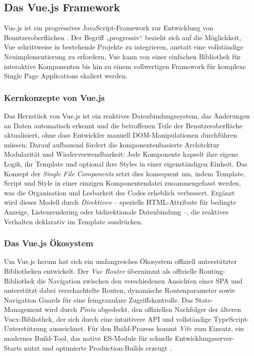 \subsection{Das Vue.js Framework}
\label{subsec:vuejs}

Vue.js ist ein progressives JavaScript-Framework zur Entwicklung von Benutzeroberflächen \cite{vuejs2025, ribeiro2020}. Der Begriff „progressiv“ bezieht sich auf die Möglichkeit, Vue schrittweise in bestehende Projekte zu integrieren, anstatt eine vollständige Neuimplementierung zu erfordern. Vue kann von einer einfachen Bibliothek für interaktive Komponenten bis hin zu einem vollwertigen Framework für komplexe Single Page Applications skaliert werden.

\subsubsection{Kernkonzepte von Vue.js}

Das Herzstück von Vue.js ist ein reaktives Datenbindungssystem, das Änderungen an Daten automatisch erkennt und die betroffenen Teile der Benutzeroberfläche aktualisiert, ohne dass Entwickler manuell DOM-Manipulationen durchführen müssen. Darauf aufbauend fördert die komponentenbasierte Architektur Modularität und Wiederverwendbarkeit: Jede Komponente kapselt ihre eigene Logik, ihr Template und optional ihre Styles in einer eigenständigen Einheit. Das Konzept der \textit{Single File Components} setzt dies konsequent um, indem Template, Script und Style in einer einzigen Komponentendatei zusammengefasst werden, was die Organisation und Lesbarkeit des Codes erheblich verbessert. Ergänzt wird dieses Modell durch \textit{Direktiven} – spezielle HTML-Attribute für bedingte Anzeige, Listenrendering oder bidirektionale Datenbindung –, die reaktives Verhalten deklarativ im Template ausdrücken.

\subsubsection{Das Vue.js Ökosystem}

Um Vue.js herum hat sich ein umfangreiches Ökosystem offiziell unterstützter Bibliotheken entwickelt. Der \textit{Vue Router} übernimmt als offizielle Routing-Bibliothek die Navigation zwischen den verschiedenen Ansichten einer SPA und unterstützt dabei verschachtelte Routen, dynamische Routenparameter sowie Navigation Guards für eine feingranulare Zugriffskontrolle. Das State-Management wird durch \textit{Pinia} abgedeckt, den offiziellen Nachfolger der älteren Vuex-Bibliothek, der sich durch eine intuitivere API und vollständige TypeScript-Unterstützung auszeichnet. Für den Build-Prozess kommt \textit{Vite} zum Einsatz, ein modernes Build-Tool, das native ES-Module für schnelle Entwicklungsserver-Starts nutzt und optimierte Production-Builds erzeugt \cite{vite2025}.

